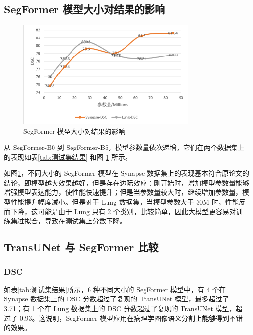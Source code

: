 \documentclass[hyperref,a4paper,UTF8]{ctexart}
\begin{document}
\subsection{SegFormer 模型大小对结果的影响}

\begin{figure}[h]
    \centering
    \includegraphics[width=0.8\textwidth]{figures/SegFormer模型大小对结果的影响.png}
    \caption{SegFormer 模型大小对结果的影响}
    \label{fig:SegFormer模型大小对结果的影响}
\end{figure}

从 SegFormer-B0 到 SegFormer-B5，模型参数量依次递增，它们在两个数据集上的表现如表\ref{tab:测试集结果} 和图 \ref{fig:SegFormer模型大小对结果的影响} 所示。

如图\ref{fig:SegFormer模型大小对结果的影响}，不同大小的 SegFormer 模型在 Synapse 数据集上的表现基本符合原论文\cite{ref2}的结论，即模型越大效果越好，但是存在边际效应：刚开始时，增加模型参数量能够增强模型表达能力，使性能快速提升；但是当参数量较大时，继续增加参数量，模型性能提升幅度减小。但是对于 Lung 数据集，当模型参数大于 30M 时，性能反而下降，这可能是由于 Lung 只有 2 个类别，比较简单，因此大模型更容易对训练集过拟合，导致在测试集上分数下降。

\subsection{TransUNet 与 SegFormer 比较}

\subsubsection{DSC}

如表\ref{tab:测试集结果}所示，6 种不同大小的 SegFormer 模型中，有 4 个在 Synapse 数据集上的 DSC 分数超过了复现的 TransUNet 模型，最多超过了 3.71；有 1 个在 Lung 数据集上的 DSC 分数超过了复现的 TransUNet 模型，超过了 0.93。这说明，SegFormer 模型应用在病理学图像语义分割上\textbf{能够}得到不错的效果。
\end{document}
